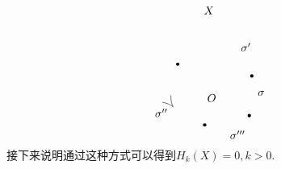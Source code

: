 \documentclass{article}
\begin{document}
\[\begin{tikzpicture}[x=0.75pt,y=0.75pt,yscale=-1,xscale=1]
            \draw  [line width=3] [line join = round][line cap = round] (263.24,145.03) .. controls (263.24,145.03) and (263.24,145.03) .. (263.24,145.03) ;
            \draw  [line width=3] [line join = round][line cap = round] (175.24,131.03) .. controls (175.24,131.03) and (175.24,131.03) .. (175.24,131.03) ;
            \draw  [line width=3] [line join = round][line cap = round] (207.24,203.03) .. controls (207.24,203.03) and (207.24,203.03) .. (207.24,203.03) ;
            \draw  [line width=3] [line join = round][line cap = round] (260.24,192.03) .. controls (260.24,192.03) and (260.24,192.03) .. (260.24,192.03) ;
            \draw   (167.16,167.93) .. controls (166.89,173.42) and (167.75,177.98) .. (169.75,181.63) .. controls (166.61,178.89) and (162.34,177.08) .. (156.92,176.17) ;
            
            \draw (205,61.4) node [anchor=north west][inner sep=0.75pt]    {$X$};
            \draw (209,165.4) node [anchor=north west][inner sep=0.75pt]    {$O$};
            \draw (269,161.4) node [anchor=north west][inner sep=0.75pt]    {$\sigma $};
            \draw (249,104.4) node [anchor=north west][inner sep=0.75pt]    {$\sigma '$};
            \draw (147,182.4) node [anchor=north west][inner sep=0.75pt]    {$\sigma ''$};
            \draw (236,208.4) node [anchor=north west][inner sep=0.75pt]    {$\sigma '''$};
            
            
            \end{tikzpicture}\]           
            接下来说明通过这种方式可以得到$H_k(X) = 0,k >0$.
\end{document}
